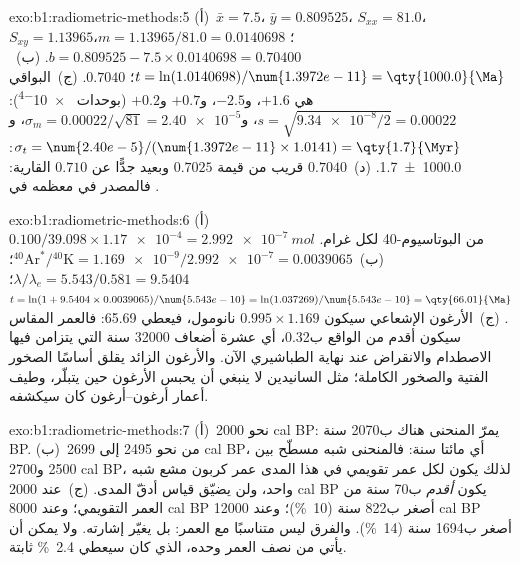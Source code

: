 \begin{solution}{exo:b1:radiometric-methods:5}
(أ)~$\bar x = 7.5$، $\bar y = 0.809525$، $S_{xx} = 81.0$، $S_{xy} = 1.13965$؛
$m = 1.13965/81.0 = 0.0140698$، $b = 0.809525 - 7.5 \times 0.0140698 = 0.70400$.
(ب)~$t = \ln(1.0140698)/\num{1.3972e-11} = \qty{1000.0}{\Ma}$؛ 
$0.7040$. (ج)~البواقي هي $+1.6$، و$-2.5$، و$+0.7$ و$+0.2$ (بوحدات
\num{e-4}): $s = \sqrt{\num{9.34e-8}/2} = 0.00022$، و$\sigma_m = 0.00022/\sqrt{81}
= \num{2.40e-5}$، و$\sigma_t = \num{2.40e-5}/(\num{1.3972e-11} \times 1.0141) =
\qty{1.7}{\Myr}$: \qty[uncertainty-mode=separate]{1000.0(17)}{\Ma}. (د)~$0.7040$
قريب من قيمة  $0.7025$ وبعيد جدًّا عن $0.710$ القارية: فالمصدر في معظمه في .
\end{solution}

\begin{solution}{exo:b1:radiometric-methods:6}
(أ)~$0.100/39.098 \times \num{1.17e-4} = \qty{2.992e-7}{mol}$ من البوتاسيوم-40 لكل
غرام. (ب)~${}^{40}\mathrm{Ar}^*/{}^{40}\mathrm{K} = \num{1.169e-9}/\num{2.992e-7}
= 0.0039065$؛ $\lambda/\lambda_e = 5.543/0.581 = 9.5404$؛ $t = \ln(1 + 9.5404
\times 0.0039065)/\num{5.543e-10} = \ln(1.037269)/\num{5.543e-10} =
\qty{66.01}{\Ma}$. (ج)~الأرغون الإشعاعي سيكون $0.995 \times 1.169$ نانومول،
فيعطي \qty{65.69}{\Ma}: فالعمر المقاس سيكون أقدم من الواقع ب\qty{0.32}{\Myr}، أي عشرة أضعاف \num{32000} سنة التي يتزامن فيها الاصطدام والانقراض عند نهاية الطباشيري الآن. والأرغون الزائد يقلق أساسًا الصخور الفتية والصخور الكاملة؛  مثل السانيدين لا ينبغي أن يحبس الأرغون حين يتبلّر، وطيف أعمار أرغون–أرغون كان سيكشفه.
\end{solution}

\begin{solution}{exo:b1:radiometric-methods:7}
(أ)~نحو \num{2000} cal BP: يمرّ المنحنى هناك ب\num{2070} سنة BP. (ب)~من نحو \num{2495} إلى \num{2699} cal BP، أي مائتا سنة: فالمنحنى شبه مسطّح بين \num{2500} و\num{2700} cal BP، لذلك يكون لكل عمر تقويمي في هذا المدى عمر كربون مشع شبه واحد، ولن يضيّق قياس أدقّ المدى. (ج)~عند \num{2000} cal BP يكون  \emph{أقدم} ب\num{70} سنة من العمر التقويمي؛ وعند \num{8000} cal BP أصغر ب\num{822} سنة (\qty{10}{\percent})؛ وعند \num{12000} cal BP أصغر ب\num{1694} سنة (\qty{14}{\percent}). والفرق ليس متناسبًا مع العمر: بل يغيّر إشارته. ولا يمكن أن يأتي من نصف العمر وحده، الذي كان سيعطي \qty{2.4}{\percent} ثابتة.
\end{solution}

